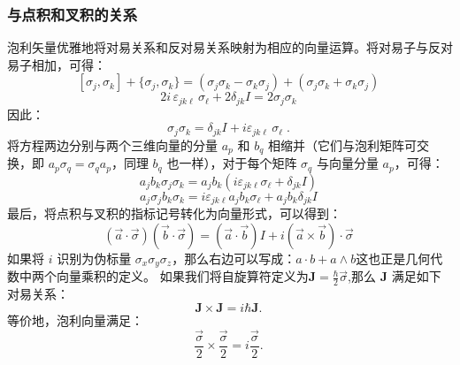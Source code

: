 \subsubsection{与点积和叉积的关系}
泡利矢量优雅地将对易关系和反对易关系映射为相应的向量运算。将对易子与反对易子相加，可得：
$$
[\sigma_j, \sigma_k] + \{\sigma_j, \sigma_k\}
= (\sigma_j \sigma_k - \sigma_k \sigma_j) + (\sigma_j \sigma_k + \sigma_k \sigma_j)~
$$
$$
2 i \, \varepsilon_{jk\ell} \, \sigma_\ell + 2 \delta_{jk} I = 2 \sigma_j \sigma_k~
$$
因此：
$$
\sigma_j \sigma_k = \delta_{jk} I + i \varepsilon_{jk\ell} \, \sigma_\ell \;.~
$$
将方程两边分别与两个三维向量的分量 $a_p$ 和 $b_q$ 相缩并（它们与泡利矩阵可交换，即 $a_p \sigma_q = \sigma_q a_p$，同理 $b_q$ 也一样），对于每个矩阵 $\sigma_q$ 与向量分量 $a_p$，可得：
$$
a_j b_k \sigma_j \sigma_k 
= a_j b_k \left( i \varepsilon_{jk\ell} \sigma_\ell + \delta_{jk} I \right)~
$$
$$
a_j \sigma_j b_k \sigma_k
= i \varepsilon_{jk\ell} a_j b_k \sigma_\ell + a_j b_k \delta_{jk} I~
$$
最后，将点积与叉积的指标记号转化为向量形式，可以得到：
$$
(\vec{a} \cdot \vec{\sigma})(\vec{b} \cdot \vec{\sigma})
= (\vec{a} \cdot \vec{b}) I
+ i (\vec{a} \times \vec{b}) \cdot \vec{\sigma}~
$$
如果将 $i$ 识别为伪标量 $\sigma_x \sigma_y \sigma_z$，那么右边可以写成：$
a \cdot b + a \wedge b$这也正是几何代数中两个向量乘积的定义。
如果我们将自旋算符定义为$\mathbf{J} = \frac{\hbar}{2} \vec{\sigma}$,那么 $\mathbf{J}$ 满足如下对易关系：
$$
\mathbf{J} \times \mathbf{J} = i\hbar \mathbf{J}.~
$$
等价地，泡利向量满足：
$$
\frac{\vec{\sigma}}{2} \times \frac{\vec{\sigma}}{2} = i \frac{\vec{\sigma}}{2}.~
$$
